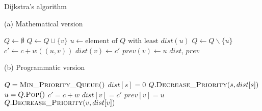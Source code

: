 \documentclass{report}[a4paper]
\theoremstyle{remark}
\begin{document}
\begin{center}
    \begin{algorithm}[ht]
        \caption{Dijkstra's algorithm}
        \label{alg-dijkstra}
        \begin{minipage}[t]{0.49\linewidth}
            (a) Mathematical version
            \begin{algorithmic}[1]
                    \State $Q \gets \emptyset$
                        \State $Q \gets Q \cup \{v\}$
                    \EndFor
                        \State $u \gets \text{element of } Q \text{ with least } dist(u)$
                        \State $Q \gets Q \backslash \{u\}$
                            \State $c' \gets c + w((u, v))$
                                \State $dist(v) \gets c'$
                                \State $prev(v) \gets u$
                            \EndIf
                        \EndFor
                    \EndWhile
                    \Return $dist$, $prev$
                \EndProcedure
            \end{algorithmic}
        \end{minipage}
        \begin{minipage}[t]{0.49\linewidth}
            (b) Programmatic version
            \begin{algorithmic}[1]
                    \State $Q = \textsc{Min\_Priority\_Queue()}$
                    \EndFor
                    \State $dist[s] = 0$
                    \State $Q.\textsc{Decrease\_Priority}(s, dist[s])$
                        \State $u = Q.\textsc{Pop}()$
                            \State $c' = c + w$
                                \State $dist[v] = c'$
                                \State $prev[v] = u$
                                \State $Q.\textsc{Decrease\_Priority}(v, dist[v])$
                            \EndIf
                        \EndFor
                    \EndWhile
                \EndProcedure
            \end{algorithmic}
        \end{minipage}
    \end{algorithm}
\end{center}
\end{document}
